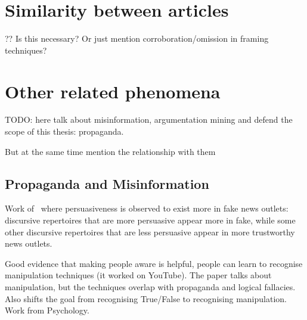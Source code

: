 









\section{Similarity between articles}
\label{sec:lit_relationships}

?? Is this necessary? Or just mention corroboration/omission in framing techniques?

\section{Other related phenomena}

TODO: here talk about misinformation, argumentation mining and defend the scope of this thesis: propaganda.

But at the same time mention the relationship with them

\subsection{Propaganda and Misinformation}

Work of~\citet{orrumachine} where persuasiveness is observed to exist more in fake news outlets: discursive repertoires that are more persuasive appear more in fake, while some other discursive repertoires that are less persuasive appear in more trustworthy news outlets.




\cite{roozenbeek2022countering} Good evidence that making people aware is helpful, people can learn to recognise manipulation techniques (it worked on YouTube). The paper talks about manipulation, but the techniques overlap with propaganda and logical fallacies. Also shifts the goal from recognising True/False to recognising manipulation. Work from Psychology.

